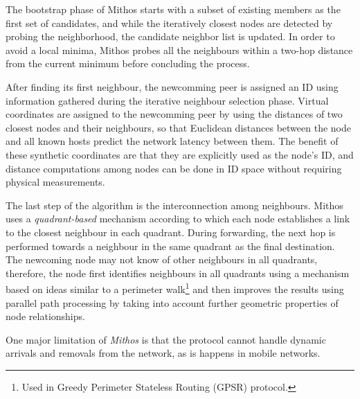 The bootstrap phase of Mithos starts with a subset of existing members as the
first set of candidates, and while the iteratively closest nodes are detected by
probing the neighborhood, the candidate neighbor list is updated. In order to
avoid a local minima, Mithos probes all the neighbours within a two-hop distance
from the current minimum before concluding the process.

After finding its first neighbour, the newcomming peer is assigned an ID using
information gathered during the iterative neighbour selection phase. Virtual
coordinates are assigned to the newcomming peer by using the distances of two
closest nodes and their neighbours, so that Euclidean distances between the node
and all known hosts predict the network latency between
them\cite{cox_vivaldi_2004}. The benefit of these synthetic coordinates are that
they are explicitly used as the node's ID, and distance computations among nodes
can be done in ID space without requiring physical measurements.

The last step of the algorithm is the interconnection among neighbours. Mithos
uses a \emph{quadrant-based} mechanism according to which each node establishes
a link to the closest neighbour in each quadrant. During forwarding, the next
hop is performed towards a neighbour in the same quadrant as the final
destination. The newcoming node may not know of other neighbours in all
quadrants, therefore, the node first identifies neighbours in all quadrants
using a mechanism based on ideas similar to a perimeter walk\footnote{Used in
Greedy Perimeter Stateless Routing (GPSR) protocol.} and then improves the
results using parallel path processing by taking into account further geometric
properties of node relationships.

One major limitation of \textit{Mithos} is that the protocol cannot handle
dynamic arrivals and removals from the network, as is happens in mobile
networks.

%
%

